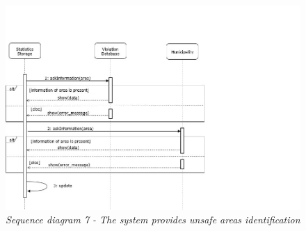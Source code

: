 \begin{figure}[H]
    \centering
    \includegraphics[width=\textwidth]{RASD_Images/SequenceDiagrams/7.jpg}
    \caption{\textit{Sequence diagram 7 - The system provides unsafe areas identification}}
\end{figure}

